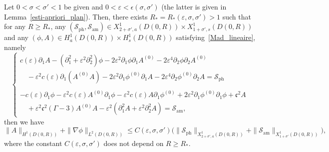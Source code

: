 \documentclass[AHL,Unicode,longabstracts,published]{cedram}
\newcommand*\p{\partial}
\newcommand{\amm}{\mathrm{am}}
\newcommand{\phl}{\mathrm{ph}}
\newcommand*\BS{\mathcal{S}}
\newcommand*\cs{{\mathfrak c}}
\newcommand*\gs{\geqslant }
\newcommand*\ls{\leqslant }
\newcommand*\e{\varepsilon}
\newcommand*\ep{\epsilon}
\newcommand*\s{\sigma}
\begin{document}
\begin{lemm}\label{esti-apriori_disque}
Let $ 0 < \s < \s' < 1 $ be given and $ 0 < \e < \ep(\s, \s') $ (the latter is given in Lemma~\ref{esti-apriori_plan}). Then, there exists $ R_* = R_* (\e, \s,\s') > 1 $ such that for any $ R \gs R_* $, any $ (\BS_{\phl}, \BS_{\amm}) \in X^{1}_{2+\s', a} (D(0,R)) \times X^{1}_{1+\s', s} (D(0,R)) $ and any $ (\phi, A) \in H^{1}_{ a} (D(0,R)) \times H^{1}_{ s} (D(0,R)) $ satisfying~\eqref{Mad_lineaire}, namely
\begin{equation*}
\left\{
\begin{array}{ll}
c(\e) \p_{1} A - \left(\p_{1}^2 + \e^2 \p^2_{2}\right) \phi - 2 \e^2 \p_{1} \phi \p_{1} A^{(0)} - 2 \e^4 \p_{2} \phi \p_{2} A^{(0)}
\\
\quad - \e^2 c(\e) \p_1 (A^{(0)} A) - 2 \e^2 \p_{1} \phi^{(0)} \p_{1} A - 2 \e^4 \p_{2} \phi^{(0)} \p_{2} A = \BS_{\phl} \\ \ \\
- c(\e) \p_{1} \phi - \e^2 c(\e) A^{(0)} \p_1 \phi - \e^2 c(\e) A \p_1 \phi^{(0)} + 2 \e^2 \p_{1} \phi^{(0)} \p_{1} \phi + \cs^2 A
\\
\quad + \e^2 \cs^2 (\Gamma -3) A^{(0)} A - \e^2 \left(\p_{1}^2 A + \e^2 \p_{2}^2 A\right) = \BS_{\amm},
\end{array}\right.
\end{equation*}
then we have
\[
\| A \|_{ H^1 (D(0,R))} + \| \nabla \phi \|_{ L^2 (D(0,R))}
\ls C (\e, \s, \s')
\Big(
\| \BS_{\phl} \|_{ X^{1}_{ 2+\s', a} (D(0,R)) } + \| \BS_{\amm} \|_{ X^{ 1}_{1+\s'} (D(0,R)) }
\Big),
\]
where the constant $ C(\e, \s, \s') $ does not depend on $ R \gs R_* $.
\end{lemm}
\end{document}
